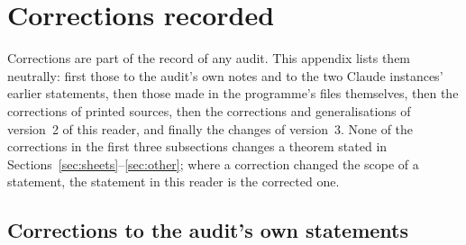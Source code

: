 \section{Corrections recorded}\label{app:corrections}

Corrections are part of the record of any audit. This appendix lists them neutrally: first those to the audit's own notes and to the two Claude instances' earlier statements, then those made in the programme's files themselves, then the corrections of printed sources, then the corrections and generalisations of version~2 of this reader, and finally the changes of version~3. None of the corrections in the first three subsections changes a theorem stated in Sections~\ref{sec:sheets}--\ref{sec:other}; where a correction changed the scope of a statement, the statement in this reader is the corrected one.

\subsection{Corrections to the audit's own statements}

